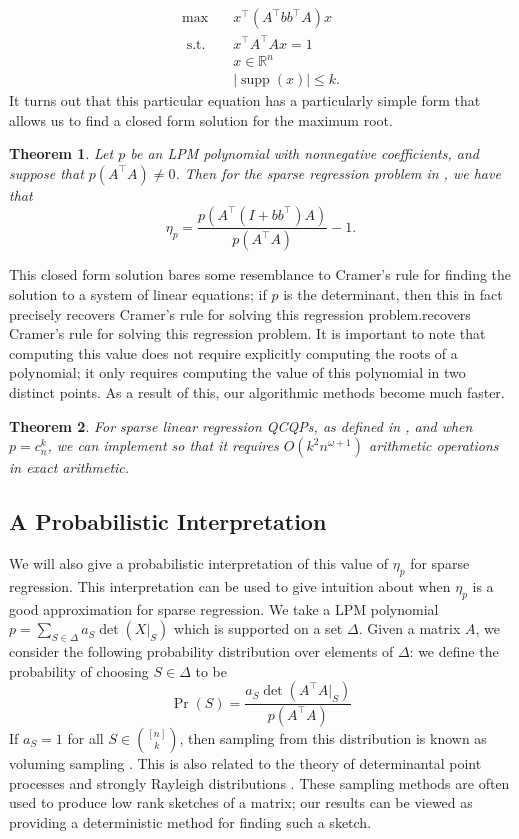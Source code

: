 \documentclass{amsart}
\newtheorem{theorem}{Theorem}[section]
\theoremstyle{definition}
\newcommand{\R}{\mathbb{R}}
\DeclareMathOperator*{\supp}{supp}
\newcommand{\st}{{\text{ s.t. }}}
\begin{document}
\begin{equation*}
\begin{aligned}
    \max\quad & x^{\intercal}(A^{\intercal}bb^{\intercal}A)x\\
    \st & x^{\intercal}A^{\intercal}Ax = 1\\
        & x \in \R^n\\
        &|\supp(x)| \le k.
\end{aligned}
\label{eq:sparse_reg}
\end{equation*}
It turns out that this particular equation has a particularly simple form that allows us to find a closed form solution for the maximum root.
\begin{theorem}
    \label{thm:sparse_reg_closed_form}
    Let $p$ be an LPM polynomial with nonnegative coefficients, and suppose that $p(A^{\intercal}A) \neq 0$.
    Then for the sparse regression problem in , we have that
    \[
        \eta_p = \frac{p(A^{\intercal} ( I + bb^{\intercal})A)}{p(A^{\intercal}A)} - 1.
    \]
\end{theorem}
This closed form solution bares some resemblance to Cramer's rule for finding the solution to a system of linear equations; if $p$ is the determinant, then this in fact precisely recovers Cramer's rule for solving this regression problem.recovers Cramer's rule for solving this regression problem.
It is important to note that computing this value does not require explicitly computing the roots of a polynomial; it only requires computing the value of this polynomial in two distinct points.
As a result of this, our algorithmic methods become much faster.

\begin{theorem}
    \label{thm:sparse_reg_fast}
    For sparse linear regression QCQPs, as defined in , and when $p = c_n^k$, we can implement  so that it requires $O(k^2n^{\omega+1})$ arithmetic operations in exact arithmetic.
\end{theorem}

\subsection{A Probabilistic Interpretation}
\label{sec:probabilistic}
We will also give a probabilistic interpretation of this value of $\eta_p$ for sparse regression.
This interpretation can be used to give intuition about when $\eta_p$ is a good approximation for sparse regression.
We take a LPM polynomial $p = \sum_{S \in \Delta} a_S \det(X|_S)$ which is supported on a set $\Delta$.
Given a matrix $A$, we consider the following probability distribution over elements of $\Delta$: we define the probability of choosing $S \in \Delta$ to be
\[
    \Pr(S) = \frac{a_S \det(A^{\intercal}A|_S)}{p(A^{\intercal}A)}
\]
If $a_S = 1$ for all $S \in \binom{[n]}{k}$, then sampling from this distribution is known as voluming sampling \cite{deshpande2006matrix}.
This is also related to the theory of determinantal point processes and strongly Rayleigh distributions \cite{anari2016monte}.
These sampling methods are often used to produce low rank sketches of a matrix; our results can be viewed as providing a deterministic method for finding such a sketch.
\end{document}
